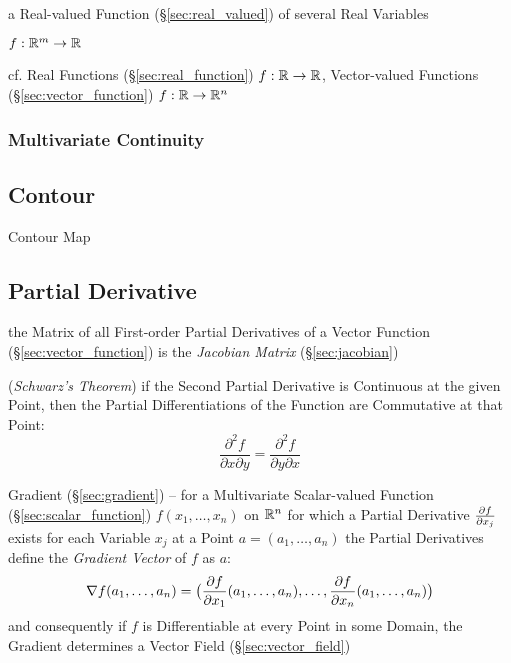 a Real-valued Function (\S\ref{sec:real_valued}) of several Real Variables

$f : \mathbb{R}^m \rightarrow \mathbb{R}$

cf. Real Functions (\S\ref{sec:real_function}) $f : \mathbb{R} \rightarrow \mathbb{R}$,
Vector-valued Functions (\S\ref{sec:vector_function})
$f : \mathbb{R} \rightarrow \mathbb{R}^n$



\subsubsection{Multivariate Continuity}\label{sec:multivariate_continuity}



\subsection{Contour}\label{sec:contour}

Contour Map



\subsection{Partial Derivative}\label{sec:partial_derivative}

the Matrix of all First-order Partial Derivatives of a Vector Function
(\S\ref{sec:vector_function}) is the \emph{Jacobian Matrix}
(\S\ref{sec:jacobian})

(\emph{Schwarz's Theorem}) if the Second Partial Derivative is Continuous at the
given Point, then the Partial Differentiations of the Function are Commutative
at that Point:
\[
  \frac{\partial^2f}{\partial{x}\partial{y}}
    = \frac{\partial^2f}{\partial{y}\partial{x}}
\]

Gradient (\S\ref{sec:gradient}) -- for a Multivariate Scalar-valued Function
(\S\ref{sec:scalar_function}) $f(x_1, \ldots, x_n)$ on $\mathbb{R}^n$ for which a
Partial Derivative $\frac{\partial{f}}{\partial{x_j}}$ exists for each Variable $x_j$ at a Point
$a = (a_1, \ldots, a_n)$ the Partial Derivatives define the \emph{Gradient
  Vector} of $f$ as $a$:
\[
  \nabla{f}(a_1, \ldots, a_n) = \big( \frac{\partial{f}}{\partial{x_1}}(a_1, \ldots, a_n), \ldots,
  \frac{\partial{f}}{\partial{x_n}}(a_1, \ldots, a_n) \big)
\]
and consequently if $f$ is Differentiable at every Point in some Domain, the
Gradient determines a Vector Field (\S\ref{sec:vector_field})

